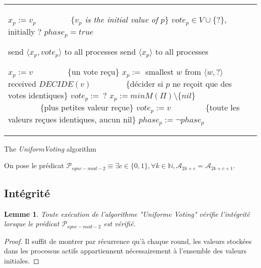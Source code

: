 \documentclass{article}
\newtheorem{lemma}{Lemme}
\begin{document}
\begin{algorithm}[htb]
\scriptsize{
\begin{distribalgo}[1]
\begin{tabular}{ll}
\begin{minipage}{33em}


\INDENT{\textbf{Initialization:}}
  \STATE $x_p := v_p$ ~~~~~~~~\{\emph{$v_p$ is the initial value of $p$}\}
  \STATE $vote_p \in V\cup\{ ? \}$, initially $?$
  \STATE $phase_p = true$

\ENDINDENT
\BLANK

\INDENT{\textbf{Round $r$:}}
	\INDENT{$S_p^r:$}
		\IF{$phase_p$}
			\STATE send $\langle x_p , vote_p \rangle$ to all processes
		\ELSE
			\STATE send $\langle x_p \rangle$ to all processes
		\ENDIF
	\ENDINDENT
	\BLANK
	\INDENT{$T_p^r:$}

		\IF{$phase_p$}
			\IF{$M(q) = \langle v, v \rangle$}
				\STATE $x_p:= v$ ~~~~~~~~\{un vote reçu\}
			\ELSE
				\STATE $x_p :=$ smallest  $w$ from  $\langle w , ? \rangle$ received
			\ENDIF
			\IF{$M(\Pi) = \langle v, v \rangle$}
				\STATE $DECIDE(v)$ ~~~~~~~~\{décider si $p$ ne reçoit que des votes identiques\}
			\ENDIF
			\STATE $vote_p :=\ ?$
		\ELSE
			\STATE $ x_p := min M(\Pi) \setminus \{nil\}$ ~~~~~~~~\{plus petites valeur reçue\}
			\IF{$M(\Pi) = \{v\}$}
				\STATE $vote_p := v$ ~~~~~~~~\{toute les valeurs reçues identiques, aucun nil\}
			\ENDIF
		\ENDIF
		\STATE $phase_p := \neg phase_p$
	\ENDINDENT
\ENDINDENT

\end{minipage}
\end{tabular}

\caption{The {\em UniformVoting} algorithm}
\label{unifvotfig}
\end{distribalgo}
}
\end{algorithm}

On pose le prédicat $\mathcal{P}_{sync-mod-2} \equiv \exists c \in \{0, 1\}, \forall k \in \mathds{N}, \mathcal{A}_{2k+c} = \mathcal{A}_{2k+c+1}$.

\subsection{Intégrité}
\begin{lemma}
	Toute exécution de l'algorithme "Uniforme Voting" vérifie l'intégrité lorsque le prédicat $\mathcal{P}_{sync-mod-2}$ est vérifié.
\end{lemma}
\begin{proof}
	Il suffit de montrer par récurrence qu'à chaque round, les valeurs stockées dans les processus actifs appartiennent nécessairement à l'ensemble des valeurs initiales.
\end{proof}
\end{document}

